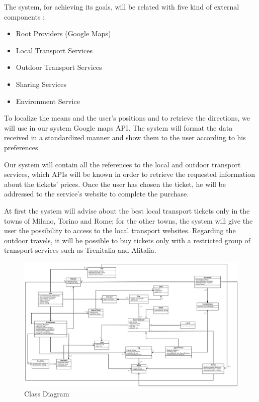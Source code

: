 \vspace*{-5mm}

The system, for achieving its goals, will be related with five kind of external components :
\begin{itemize}
	\setlength{\leftskip}{0.5cm}
	\item Root Providers (Google Maps)
	\item Local Transport Services
	\item Outdoor Transport Services
	\item Sharing Services
	\item Environment Service
\end{itemize}
To localize the means and the user’s positions and to retrieve the directions, we will use in our system Google maps API. The system will format the data received in a standardized manner and show them to the user according to his preferences.\par
Our system will contain all the references to the local and outdoor transport services, which APIs will be known in order to retrieve the requested information about the tickets’ prices. 
Once the user has chosen the ticket, he will be addressed to the service’s website to complete the purchase.\par
At first the system will advise about the best local transport tickets only in the towns of Milano, Torino and Rome; for the other towns, the system will give the user the possibility to access to the local transport websites.
Regarding the outdoor travels, it will be possible to buy tickets only with a restricted group of transport services such as Trenitalia and Alitalia.
\begin{figure}[H]
	\centering
	\includegraphics[scale=0.25]{Images/Class_Diagram}
	\caption{Class Diagram}
\end{figure}

